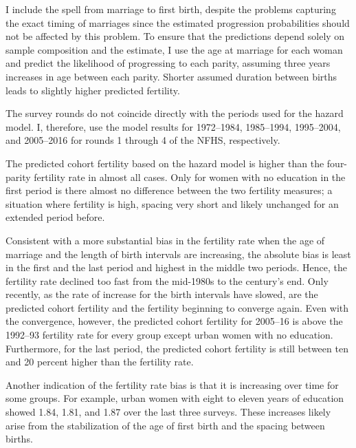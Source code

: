 \documentclass[12pt,letterpaper]{article}
\begin{document}
I include the spell from marriage to first birth, despite the problems
capturing the exact timing of marriages since the estimated progression
probabilities should not be affected by this problem.
To ensure that the predictions depend solely on sample composition and the estimate, I
use the age at marriage for each woman and predict the likelihood of progressing to
each parity, assuming three years increases in age between each parity.
Shorter assumed duration between births leads to slightly higher predicted 
fertility.

The survey rounds do not coincide directly with the periods used for the hazard model.
I, therefore, use the model results for 1972--1984, 1985--1994, 1995--2004,
and 2005--2016 for rounds 1 through 4 of the NFHS, respectively.


The predicted cohort fertility based on the hazard model is higher than the four-parity 
fertility rate in almost all cases.
Only for women with no education in the first period is there almost no difference 
between the two fertility measures; a situation where fertility is high, spacing
very short and likely unchanged for an extended period before.

Consistent with a more substantial bias in the fertility rate when the age of marriage 
and the length of birth intervals are increasing, the absolute bias is least in the first and the last 
period and highest in the middle two periods.
Hence, the fertility rate declined too fast from the mid-1980s to the century's end.
Only recently, as the rate of increase for the birth intervals have
slowed, are the predicted cohort fertility and the fertility beginning
to converge again.
Even with the convergence, however, the predicted cohort fertility for 2005--16 is 
above the 1992--93 fertility rate for every group except urban women with no education.
Furthermore, for the last period, the predicted cohort fertility is still between ten
and 20 percent higher than the fertility rate. 

Another indication of the fertility rate bias is that it is increasing over time for some 
groups.
For example, urban women with eight to eleven years of education showed 1.84, 1.81, and
1.87 over the last three surveys.
These increases likely arise from the stabilization of the age of first birth and the 
spacing between births.
\end{document}
